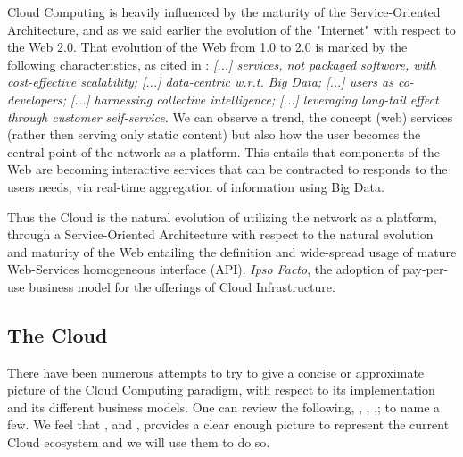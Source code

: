 \documentclass[11pt]{amsart}
\begin{document}
	Cloud Computing is heavily influenced by the maturity of the Service-Oriented Architecture, 
	and as we said earlier the evolution of the "Internet" with respect to the Web 2.0. That 
	evolution of the Web from 1.0 to 2.0 is marked by the following characteristics, as cited in 
	\cite{web20}: \emph{[...] services, not packaged software, with cost-effective scalability; 
	[...] data-centric w.r.t. Big Data; [...] users as co-developers; [...] harnessing collective 
	intelligence; [...] leveraging long-tail effect through customer self-service.} We can observe 
	a trend, the concept (web) services (rather then serving only static content) but also how 
	the user becomes the central point of the network as a platform. This entails that components 
	of the Web are becoming interactive services that can be contracted to responds to the users 
	needs, via real-time aggregation of information using Big Data.

	Thus the Cloud is the natural evolution of utilizing the network as a platform, through a 
	Service-Oriented Architecture with respect to the natural evolution and maturity of the 
	Web entailing the definition and wide-spread usage of mature Web-Services homogeneous 
	interface (API). \emph{Ipso Facto}, the adoption of pay-per-use business model for the 
	offerings of Cloud Infrastructure.
	
	\subsection{The Cloud}
	There have been numerous attempts to try to give a concise or approximate picture of the 
	Cloud Computing paradigm, with respect to its implementation and its different business 
	models. One can review the following, \cite{soa_cloud}, \cite{vaquero}, \cite{ontology},\cite{panzieri}; 
	to name a few. We feel that \cite{nist}, \cite{soa_cloud} and \cite{ontology}, provides a 
	clear enough picture to represent the current Cloud ecosystem and we will use them to do so.
		
\end{document}
